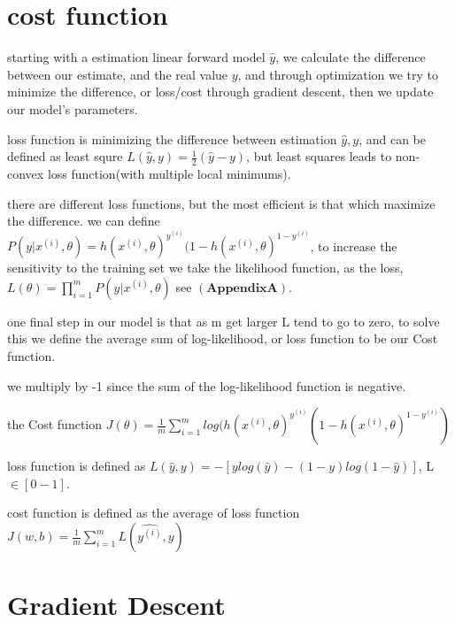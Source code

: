 \documentclass[4apaper,12pt]{book}
\begin{document}
\section{cost function}

\begin{description}
\item starting with a estimation linear forward model $\hat{y}$, we calculate the difference between our estimate, and the real value $y$, and through optimization we try to minimize the difference, or loss/cost through gradient descent, then we update our model's parameters.
  \item loss function is minimizing the difference between estimation ${\hat{y}, y}$, and can be defined as least squre $L(\hat{y}, y)=\frac{1}{2}(\hat{y} - y)$, but least squares leads to non-convex loss function(with multiple local minimums).
\item there are different loss functions, but the most efficient is that which maximize the difference. we can define $P(y|x^{(i)}, \theta) = h(x^{(i)},\theta)^{y^{(i)}}(1-h(x^{(i)},\theta)^{1-y^{(i)}}$, to increase the sensitivity to the training set we take the likelihood function, as the loss, $L(\theta)=\prod_{i=1}^mP(y|x^{(i)}, \theta)$ see $\mathbf{(AppendixA)}$.
\item one final step in our model is that as m get larger L tend to go to zero, to solve this we define the average sum of log-likelihood, or loss function to be our Cost function.
\item we multiply by -1 since the sum of the log-likelihood function is negative.
\item the Cost function  $J(\theta)=\frac{1}{m}\sum_{i=1}^{m}log(h(x^{(i)},\theta)^{y^{(i)}}(1-h(x^{(i)},\theta)^{1-y^{(i)}})$

\item loss function is defined as $L(\hat{y}, y)=-[ylog(\hat{y}) - (1-y)log(1-\hat{y})]$, L$\in[0-1]$.

\item cost function is defined as the average of loss function $J(w,b)=\frac{1}{m}\sum_{i=1}^{m}L(\hat{y^{(i)}}, y)$
\end{description}

\section{Gradient Descent}
\end{document}
